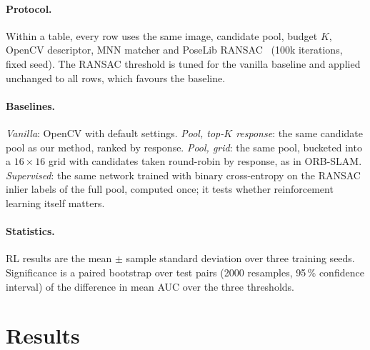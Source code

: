 \documentclass[10pt,twocolumn,letterpaper]{article}
\begin{document}
\paragraph{Protocol.}
Within a table, every row uses the same image, candidate pool, budget $K$, OpenCV descriptor, MNN
matcher and PoseLib RANSAC~\cite{larsson2020poselib} (100k iterations, fixed seed). The RANSAC threshold
is tuned for the vanilla baseline and applied unchanged to all rows, which favours the baseline.

\paragraph{Baselines.}
\emph{Vanilla}: OpenCV with default settings. \emph{Pool, top-$K$ response}: the same candidate pool as
our method, ranked by response. \emph{Pool, grid}: the same pool, bucketed into a $16\times16$ grid
with candidates taken round-robin by response, as in ORB-SLAM. \emph{Supervised}: the same network
trained with binary cross-entropy on the RANSAC inlier labels of the full pool, computed once; it tests
whether reinforcement learning itself matters.

\paragraph{Statistics.}
RL results are the mean $\pm$ sample standard deviation over three training seeds. Significance is a
paired bootstrap over test pairs (2000 resamples, 95\,\% confidence interval) of the difference in mean
AUC over the three thresholds.

\section{Results}
\label{sec:results}
\end{document}
